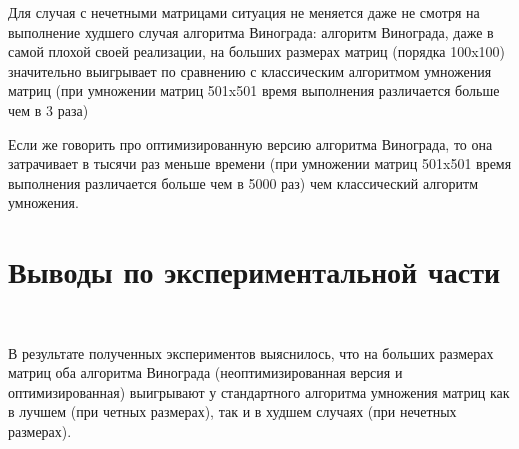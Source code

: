 \documentclass[12pt]{report}
\begin{document}
	
	
	Для случая с нечетными матрицами ситуация не меняется даже не смотря на выполнение худшего случая алгоритма Винограда: алгоритм Винограда, даже в самой плохой своей реализации, на больших размерах матриц (порядка 100x100) значительно выигрывает по сравнению с классическим алгоритмом умножения матриц (при умножении матриц 501x501 время выполнения различается больше чем в 3 раза)
	
	Если же говорить про оптимизированную версию алгоритма Винограда, то она затрачивает в тысячи раз меньше времени (при умножении матриц 501x501 время выполнения различается больше чем в 5000 раз) чем классический алгоритм умножения. 
	
	\section{Выводы по экспериментальной части}
	
	~\
	
	В результате полученных экспериментов выяснилось, что на больших размерах матриц оба алгоритма Винограда (неоптимизированная версия и оптимизированная) выигрывают у стандартного алгоритма умножения матриц как в лучшем (при четных размерах), так и в худшем случаях (при нечетных размерах).
	
\end{document}
